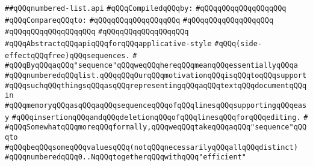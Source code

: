 \label{src/lib/src/numbered-list.api}
\verb|##qQQqnumbered-list.api|\newline
\newline
\verb|#qQQqCompiledqQQqby:|\newline
\verb|#qQQqqQQqqQQqqQQqqQQq|\newline
\newline
\verb|#qQQqCompareqQQqto:|\newline
\verb|#qQQqqQQqqQQqqQQqqQQq|\newline
\verb|#qQQqqQQqqQQqqQQqqQQq|\newline
\verb|#qQQqqQQqqQQqqQQqqQQq|\newline
\verb|#qQQqqQQqqQQqqQQqqQQq|\newline
\newline
\newline
\newline
\newline
\verb|#qQQqAbstractqQQqapiqQQqforqQQqapplicative-style|\newline
\verb|#qQQq(side-effectqQQqfree)qQQqsequences.|\newline
\verb|#|\newline
\verb|#qQQqByqQQqaqQQq"sequence"qQQqweqQQqhereqQQqmeanqQQqessentiallyqQQqa|\newline
\verb|#qQQqnumberedqQQqlist.qQQqqQQqOurqQQqmotivationqQQqisqQQqtoqQQqsupport|\newline
\verb|#qQQqsuchqQQqthingsqQQqasqQQqrepresentingqQQqaqQQqtextqQQqdocumentqQQqin|\newline
\verb|#qQQqmemoryqQQqasqQQqaqQQqsequenceqQQqofqQQqlinesqQQqsupportingqQQqeasy|\newline
\verb|#qQQqinsertionqQQqandqQQqdeletionqQQqofqQQqlinesqQQqforqQQqediting.|\newline
\verb|#|\newline
\verb|#qQQqSomewhatqQQqmoreqQQqformally,qQQqweqQQqtakeqQQqaqQQq"sequence"qQQqto|\newline
\verb|#qQQqbeqQQqsomeqQQqvaluesqQQq(notqQQqnecessarilyqQQqallqQQqdistinct)|\newline
\verb|#qQQqnumberedqQQq0..NqQQqtogetherqQQqwithqQQq"efficient"|\newline
